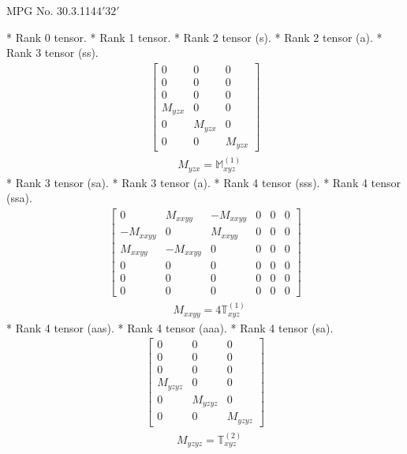 \documentclass[fleqn,8pt,landscape]{jsarticle}
\begin{document}
\setcounter{MaxMatrixCols}{32}

\renewcommand{\tablename}{Table~}
\renewcommand{\figurename}{Figure~}
\begin{center}
\LARGE
MPG No. 30.3.114\quad$4'32'$
\end{center}
* Rank 0 tensor.
* Rank 1 tensor.
* Rank 2 tensor (s).
* Rank 2 tensor (a).
* Rank 3 tensor (ss).
\begin{align*}
\begin{bmatrix} 0 & 0 & 0 \\ 0 & 0 & 0 \\ 0 & 0 & 0 \\ M_{yzx} & 0 & 0 \\ 0 & M_{yzx} & 0 \\ 0 & 0 & M_{yzx} \end{bmatrix}
\end{align*}
\begin{align*}
& M_{yzx} = \mathbb{M}_{xyz}^{(1)}
\end{align*}
* Rank 3 tensor (sa).
* Rank 3 tensor (a).
* Rank 4 tensor (sss).
* Rank 4 tensor (ssa).
\begin{align*}
\begin{bmatrix} 0 & M_{xxyy} & - M_{xxyy} & 0 & 0 & 0 \\ - M_{xxyy} & 0 & M_{xxyy} & 0 & 0 & 0 \\ M_{xxyy} & - M_{xxyy} & 0 & 0 & 0 & 0 \\ 0 & 0 & 0 & 0 & 0 & 0 \\ 0 & 0 & 0 & 0 & 0 & 0 \\ 0 & 0 & 0 & 0 & 0 & 0 \end{bmatrix}
\end{align*}
\begin{align*}
& M_{xxyy} = 4 \mathbb{T}_{xyz}^{(1)}
\end{align*}
* Rank 4 tensor (aas).
* Rank 4 tensor (aaa).
* Rank 4 tensor (sa).
\begin{align*}
\begin{bmatrix} 0 & 0 & 0 \\ 0 & 0 & 0 \\ 0 & 0 & 0 \\ M_{yzyz} & 0 & 0 \\ 0 & M_{yzyz} & 0 \\ 0 & 0 & M_{yzyz} \end{bmatrix}
\end{align*}
\begin{align*}
& M_{yzyz} = \mathbb{T}_{xyz}^{(2)}
\end{align*}
\end{document}
